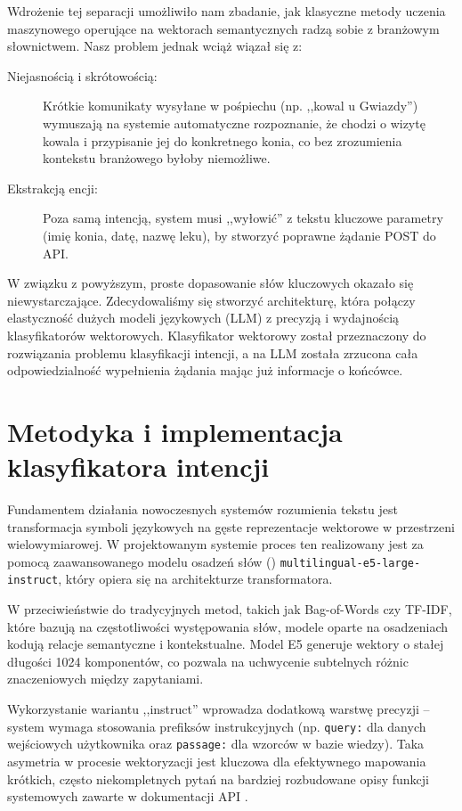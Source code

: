 Wdrożenie tej separacji umożliwiło nam zbadanie, jak klasyczne metody uczenia maszynowego operujące na wektorach semantycznych radzą sobie z branżowym słownictwem.
Nasz problem jednak wciąż wiązał się z:

\begin{description}
    \item[Niejasnością i skrótowością:] Krótkie komunikaty wysyłane w pośpiechu (np. ,,kowal u Gwiazdy'') wymuszają na systemie automatyczne rozpoznanie, że chodzi o wizytę kowala i przypisanie jej do konkretnego konia, co bez zrozumienia kontekstu branżowego byłoby niemożliwe.
    \item[Ekstrakcją encji:] Poza samą intencją, system musi ,,wyłowić'' z tekstu kluczowe parametry (imię konia, datę, nazwę leku), by stworzyć poprawne żądanie POST do API.
\end{description}

W związku z powyższym, proste dopasowanie słów kluczowych okazało się niewystarczające. Zdecydowaliśmy się stworzyć architekturę, która połączy elastyczność dużych modeli językowych (LLM) z precyzją i wydajnością klasyfikatorów wektorowych. Klasyfikator wektorowy został przeznaczony do rozwiązania problemu klasyfikacji intencji, a na LLM została zrzucona cała odpowiedzialność wypełnienia żądania mając już informacje o końcówce.

\section{Metodyka i implementacja klasyfikatora intencji}

Fundamentem działania nowoczesnych systemów rozumienia tekstu jest transformacja symboli językowych na gęste reprezentacje wektorowe w przestrzeni wielowymiarowej. W projektowanym systemie proces ten realizowany jest za pomocą zaawansowanego modelu osadzeń słów () \texttt{multilingual-e5-large-instruct}, który opiera się na architekturze transformatora.

W przeciwieństwie do tradycyjnych metod, takich jak Bag-of-Words czy TF-IDF, które bazują na częstotliwości występowania słów, modele oparte na osadzeniach kodują relacje semantyczne i kontekstualne. Model E5 generuje wektory o stałej długości 1024 komponentów, co pozwala na uchwycenie subtelnych różnic znaczeniowych między zapytaniami.

Wykorzystanie wariantu ,,instruct'' wprowadza dodatkową warstwę precyzji -- system wymaga stosowania prefiksów instrukcyjnych (np. \texttt{query:} dla danych wejściowych użytkownika oraz \texttt{passage:} dla wzorców w bazie wiedzy). Taka asymetria w procesie wektoryzacji jest kluczowa dla efektywnego mapowania krótkich, często niekompletnych pytań na bardziej rozbudowane opisy funkcji systemowych zawarte w dokumentacji API \cite{reimers2019}.

